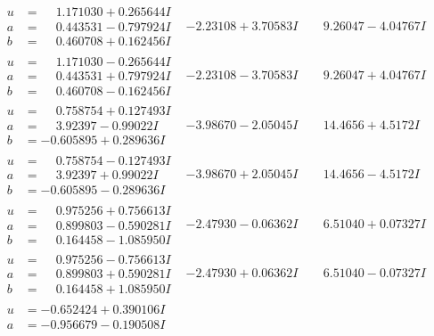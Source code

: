 \documentclass[1p]{elsarticle_modified}
\theoremstyle{definition}
\begin{document}
$$\begin{array}{c|c|c}
\begin{aligned}
u &= \phantom{-}1.171030 + 0.265644 I \\
a &= \phantom{-}0.443531 - 0.797924 I \\
b &= \phantom{-}0.460708 + 0.162456 I\end{aligned}
 & -2.23108 + 3.70583 I & \phantom{-}9.26047 - 4.04767 I \\ \hline\begin{aligned}
u &= \phantom{-}1.171030 - 0.265644 I \\
a &= \phantom{-}0.443531 + 0.797924 I \\
b &= \phantom{-}0.460708 - 0.162456 I\end{aligned}
 & -2.23108 - 3.70583 I & \phantom{-}9.26047 + 4.04767 I \\ \hline\begin{aligned}
u &= \phantom{-}0.758754 + 0.127493 I \\
a &= \phantom{-}3.92397 - 0.99022 I \\
b &= -0.605895 + 0.289636 I\end{aligned}
 & -3.98670 - 2.05045 I & \phantom{-}14.4656 + 4.5172 I \\ \hline\begin{aligned}
u &= \phantom{-}0.758754 - 0.127493 I \\
a &= \phantom{-}3.92397 + 0.99022 I \\
b &= -0.605895 - 0.289636 I\end{aligned}
 & -3.98670 + 2.05045 I & \phantom{-}14.4656 - 4.5172 I \\ \hline\begin{aligned}
u &= \phantom{-}0.975256 + 0.756613 I \\
a &= \phantom{-}0.899803 - 0.590281 I \\
b &= \phantom{-}0.164458 - 1.085950 I\end{aligned}
 & -2.47930 - 0.06362 I & \phantom{-}6.51040 + 0.07327 I \\ \hline\begin{aligned}
u &= \phantom{-}0.975256 - 0.756613 I \\
a &= \phantom{-}0.899803 + 0.590281 I \\
b &= \phantom{-}0.164458 + 1.085950 I\end{aligned}
 & -2.47930 + 0.06362 I & \phantom{-}6.51040 - 0.07327 I \\ \hline\begin{aligned}
u &= -0.652424 + 0.390106 I \\
a &= -0.956679 - 0.190508 I \\

\end{aligned}
\end{array}$$
\end{document}
